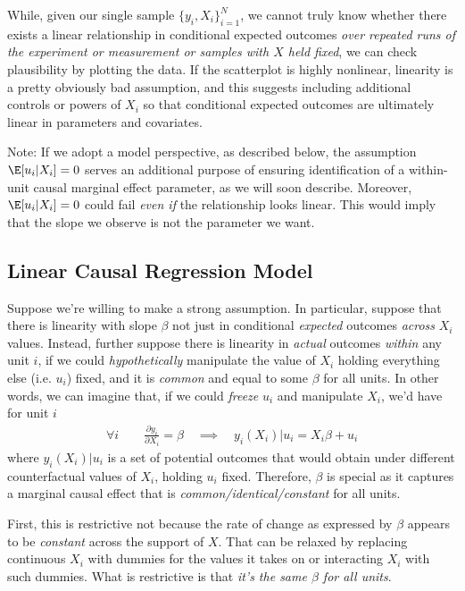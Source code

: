 \documentclass[12pt]{article}
\theoremstyle{plain}
\theoremstyle{definition}
\theoremstyle{remark}
\begin{document}
While, given our single sample $\{y_i,X_i\}_{i=1}^N$, we cannot truly
know whether there exists a linear relationship in conditional
expected outcomes
\emph{over repeated runs of the experiment or measurement or samples
with $X$ held fixed},
we can check plausibility by plotting the data.
If the scatterplot is highly nonlinear, linearity is a pretty
obviously bad assumption, and this suggests including additional
controls or powers of $X_i$ so that conditional expected outcomes
are ultimately linear in parameters and covariates.

Note: If we adopt a model perspective, as described below, the
assumption $\E[u_i|X_i]=0$ serves an additional purpose of ensuring
identification of a within-unit causal marginal effect parameter, as
we will soon describe.
Moreover, $\E[u_i|X_i]=0$ could fail \emph{even if} the relationship
looks linear. This would imply that the slope we observe is not the
parameter we want.


\subsection{Linear Causal Regression Model}

Suppose we're willing to make a strong assumption.
In particular, suppose that there is linearity with slope $\beta$
not just in conditional \emph{expected} outcomes \emph{across}
$X_i$ values.
Instead, further suppose there is linearity in \emph{actual}
outcomes \emph{within} any unit $i$, if we could
\emph{hypothetically} manipulate the value of $X_i$ holding
everything else (i.e. $u_i$) fixed, and it is \emph{common} and
equal to some $\beta$ for all units.
In other words, we can imagine that, if we could \emph{freeze} $u_i$
and manipulate $X_i$, we'd have for unit $i$
\begin{align*}
  \forall i\qquad
  \frac{\partial y_i}{\partial X_i}
  =
  \beta
  \quad\implies\quad
  y_i(X_i) | u_i = X_i\beta + u_i
\end{align*}
where $y_i(X_i)|u_i$ is a set of potential outcomes that would
obtain under different counterfactual values of $X_i$, holding $u_i$
fixed.
Therefore,
$\beta$ is special as it captures a marginal causal effect
that is \emph{common/identical/constant} for all units.

First, this is restrictive not because the rate of change as
expressed by $\beta$ appears to be \emph{constant} across the
support of $X$. That can be relaxed by replacing continuous $X_i$
with dummies
for the values it takes on or interacting $X_i$ with such dummies.
What is restrictive is that
\emph{it's the same $\beta$ for all units}.
\end{document}
